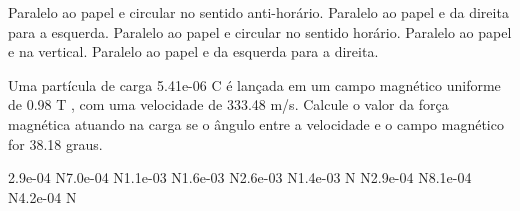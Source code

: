 \documentclass[12pt, addpoints]{exam}
\begin{document}
\begin{questions}
\begin{multicols*}{2}
\begin{choices}
\choice Paralelo ao papel e circular no sentido anti-horário. 
\choice Paralelo ao papel e da direita para a esquerda. 
\choice Paralelo ao papel e circular no sentido horário. 
\choice Paralelo ao papel e na vertical. 
\choice Paralelo ao papel e da esquerda para a direita. 
\end{choices}
\question Uma partícula de carga 5.41e-06 C é lançada em um campo magnético uniforme de    0.98 T , com uma velocidade de 333.48 m/s. Calcule o valor da força magnética atuando na carga se o ângulo entre a velocidade e o campo magnético for   38.18 graus.

\begin{oneparchoices}
\choice 2.9e-04 N\choice 7.0e-04 N\choice 1.1e-03 N\choice 1.6e-03 N\choice 2.6e-03 N\choice 1.4e-03 N N\choice 2.9e-04 N\choice 8.1e-04 N\choice 4.2e-04 N
\end{oneparchoices}\end{multicols*}
\end{questions}
\newpage
\end{document}
